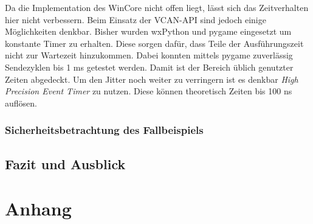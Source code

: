 \documentclass[
  a4paper,					    %
  twoside,
  DIV=calc,     				%
  bibliography=totoc,
  cleardoublepage=empty,
  ngerman,     					%
  final       					%
]{scrbook}
\begin{document}
Da die Implementation des WinCore nicht offen liegt, lässt sich das Zeitverhalten hier nicht verbessern. Beim Einsatz der VCAN-API sind jedoch einige Möglichkeiten denkbar. Bisher wurden wxPython und pygame eingesetzt um konstante Timer zu erhalten. Diese sorgen dafür, dass Teile der Ausführungszeit nicht zur Wartezeit hinzukommen. Dabei konnten mittels pygame zuverlässig Sendezyklen bis 1 ms getestet werden. Damit ist der Bereich üblich genutzter Zeiten abgedeckt. Um den Jitter noch weiter zu verringern ist es denkbar \emph{High Precision Event Timer} zu nutzen. Diese können theoretisch Zeiten bis 100 ns auflösen.



\section{Sicherheitsbetrachtung des Fallbeispiels}
\label{sec:Sicherheit_Beispiel}











\chapter{Fazit und Ausblick}
\label{sec:FazitAusblick}














\appendix
\part*{Anhang}
\end{document}
